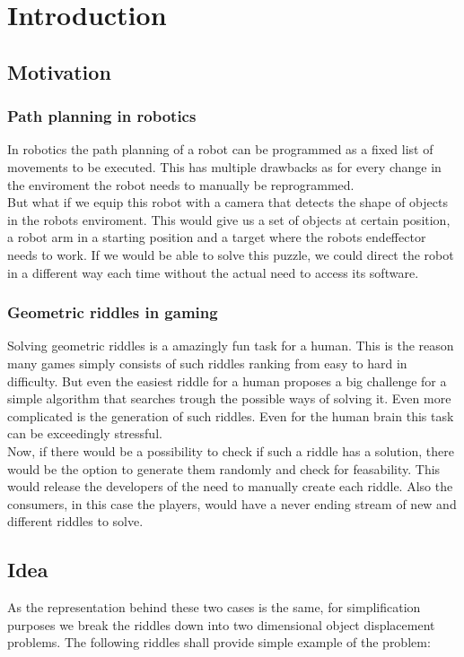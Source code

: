 \chapter{Introduction}
\label{cha:Introduction}

\section{Motivation}
\subsection{Path planning in robotics}
In robotics the path planning of a robot can be programmed as a fixed list of movements to be executed. This has multiple drawbacks as for every change in the enviroment the robot needs to manually be reprogrammed.\\
But what if we equip this robot with a camera that detects the shape of objects in the robots enviroment. This would give us a set of objects at certain position, a robot arm in a starting position and a target where the robots endeffector needs to work. If we would be able to solve this puzzle, we could direct the robot in a different way each time without the actual need to access its software.


\subsection{Geometric riddles in gaming}
Solving geometric riddles is a amazingly fun task for a human. This is the reason many games simply consists of such riddles ranking from easy to hard in difficulty. But even the easiest riddle for a human proposes a big challenge for a simple algorithm that searches trough the possible ways of solving it. Even more complicated is the generation of such riddles. Even for the human brain this task can be exceedingly stressful.\\
 Now, if there would be a possibility to check if such a riddle has a solution, there would be the option to generate them randomly and check for feasability. This would release the developers of the need to manually create each riddle. Also the consumers, in this case the players, would have a never ending stream of new and different riddles to solve.



\section{Idea}
\label{sec:Idea}
As the representation behind these two cases is the same, for simplification purposes we break the riddles down into two dimensional object displacement problems. The following riddles shall provide simple example of the problem:\\

